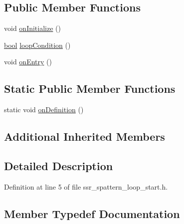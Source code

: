 \subsection*{Public Member Functions}
\begin{DoxyCompactItemize}
\item 
void \hyperlink{structsm__dance__bot_1_1s__pattern_1_1SsrSPatternLoopStart_ae42cb4e73f410b8a9cacbbf568729fc4}{on\+Initialize} ()
\item 
\hyperlink{classbool}{bool} \hyperlink{structsm__dance__bot_1_1s__pattern_1_1SsrSPatternLoopStart_aabf19cff80c6e66e729c0d82618c86ef}{loop\+Condition} ()
\item 
void \hyperlink{structsm__dance__bot_1_1s__pattern_1_1SsrSPatternLoopStart_a02c8a1edcf0f4e55574525f6526e4329}{on\+Entry} ()
\end{DoxyCompactItemize}
\subsection*{Static Public Member Functions}
\begin{DoxyCompactItemize}
\item 
static void \hyperlink{structsm__dance__bot_1_1s__pattern_1_1SsrSPatternLoopStart_a036cc00a746730598d783b9ce770b188}{on\+Definition} ()
\end{DoxyCompactItemize}
\subsection*{Additional Inherited Members}


\subsection{Detailed Description}


Definition at line 5 of file ssr\+\_\+spattern\+\_\+loop\+\_\+start.\+h.



\subsection{Member Typedef Documentation}
